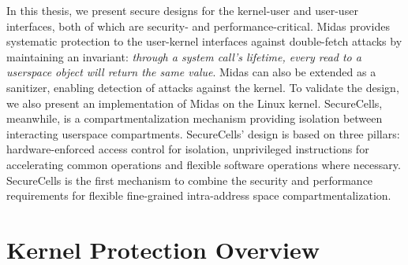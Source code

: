 In this thesis, we present secure designs for the kernel-user and user-user
interfaces, both of which are security- and performance-critical.
Midas provides systematic protection to the user-kernel interfaces against
double-fetch attacks by maintaining an invariant:
\emph{through a system call's lifetime, every read to a userspace object
will return the same value}.
Midas can also be extended as a sanitizer, enabling detection of \tocttou
attacks against the kernel.
To validate the design, we also present an implementation of Midas on the
Linux kernel.
SecureCells, meanwhile, is a compartmentalization mechanism providing isolation
between interacting userspace compartments.
SecureCells' design is based on three pillars: hardware-enforced access 
control for isolation, unprivileged instructions for accelerating common
operations and flexible software operations where necessary.
SecureCells is the first mechanism to combine the security and performance
requirements for flexible fine-grained intra-address space 
compartmentalization.


\section{Kernel \tocttou Protection Overview}

